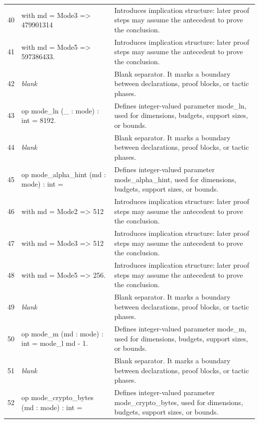 \documentclass[10pt]{article}
\begin{document}
\begin{longtable}{r L{0.53\textwidth} L{0.37\textwidth}}
40 & {\ttfamily\scriptsize   with md = Mode3 => 479901314} & Introduces implication structure: later proof steps may assume the antecedent to prove the conclusion. \\
41 & {\ttfamily\scriptsize   with md = Mode5 => 597386433.} & Introduces implication structure: later proof steps may assume the antecedent to prove the conclusion. \\
42 & {\ttfamily\scriptsize \emph{blank}} & Blank separator.  It marks a boundary between declarations, proof blocks, or tactic phases. \\
43 & {\ttfamily\scriptsize op mode\_ln (\_ : mode) : int = 8192.} & Defines integer-valued parameter mode\_ln, used for dimensions, budgets, support sizes, or bounds. \\
44 & {\ttfamily\scriptsize \emph{blank}} & Blank separator.  It marks a boundary between declarations, proof blocks, or tactic phases. \\
45 & {\ttfamily\scriptsize op mode\_alpha\_hint (md : mode) : int =} & Defines integer-valued parameter mode\_alpha\_hint, used for dimensions, budgets, support sizes, or bounds. \\
46 & {\ttfamily\scriptsize   with md = Mode2 => 512} & Introduces implication structure: later proof steps may assume the antecedent to prove the conclusion. \\
47 & {\ttfamily\scriptsize   with md = Mode3 => 512} & Introduces implication structure: later proof steps may assume the antecedent to prove the conclusion. \\
48 & {\ttfamily\scriptsize   with md = Mode5 => 256.} & Introduces implication structure: later proof steps may assume the antecedent to prove the conclusion. \\
49 & {\ttfamily\scriptsize \emph{blank}} & Blank separator.  It marks a boundary between declarations, proof blocks, or tactic phases. \\
50 & {\ttfamily\scriptsize op mode\_m (md : mode) : int = mode\_l md - 1.} & Defines integer-valued parameter mode\_m, used for dimensions, budgets, support sizes, or bounds. \\
51 & {\ttfamily\scriptsize \emph{blank}} & Blank separator.  It marks a boundary between declarations, proof blocks, or tactic phases. \\
52 & {\ttfamily\scriptsize op mode\_crypto\_bytes (md : mode) : int =} & Defines integer-valued parameter mode\_crypto\_bytes, used for dimensions, budgets, support sizes, or bounds. \\

\end{longtable}
\end{document}
